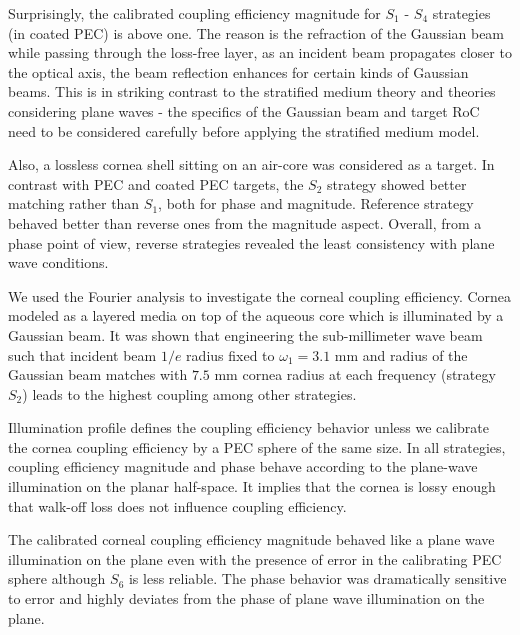 \documentclass{osa-article}
\begin{document}
Surprisingly, the calibrated coupling efficiency magnitude for $S_1$ - $S_4$ strategies (in coated PEC) is above one. The reason is the refraction of the Gaussian beam while passing through the loss-free layer, as an incident beam propagates closer to the optical axis, the beam reflection enhances for certain kinds of Gaussian beams. This is in striking contrast to the stratified medium theory and theories considering plane waves - the specifics of the Gaussian beam and target RoC need to be considered carefully before applying the stratified medium model.

Also, a lossless cornea shell sitting on an air-core was considered as a target. In contrast with PEC and coated PEC targets, the $S_2$ strategy showed better matching rather than $S_1$, both for phase and magnitude. Reference strategy behaved better than reverse ones from the magnitude aspect. Overall, from a phase point of view, reverse strategies revealed the least consistency with plane wave conditions.

We used the Fourier analysis to investigate the corneal coupling efficiency. Cornea modeled as a layered media on top of the aqueous core which is illuminated by a Gaussian beam. It was shown that engineering the sub-millimeter wave beam such that incident beam $1/e$ radius fixed to $\omega_1=3.1$ mm and radius of the Gaussian beam matches with $7.5$ mm cornea radius at each frequency (strategy $S_2$) leads to the highest coupling among other strategies. 

Illumination profile defines the coupling efficiency behavior unless we calibrate the cornea coupling efficiency by a PEC sphere of the same size. In all strategies, coupling efficiency magnitude and phase behave according to the plane-wave illumination on the planar half-space. It implies that the cornea is lossy enough that walk-off loss does not influence coupling efficiency. 

The calibrated corneal coupling efficiency magnitude behaved like a plane wave illumination on the plane even with the presence of error in the calibrating PEC sphere although $S_6$ is less reliable. The phase behavior was dramatically sensitive to error and highly deviates from the phase of plane wave illumination on the plane.  
\end{document}
